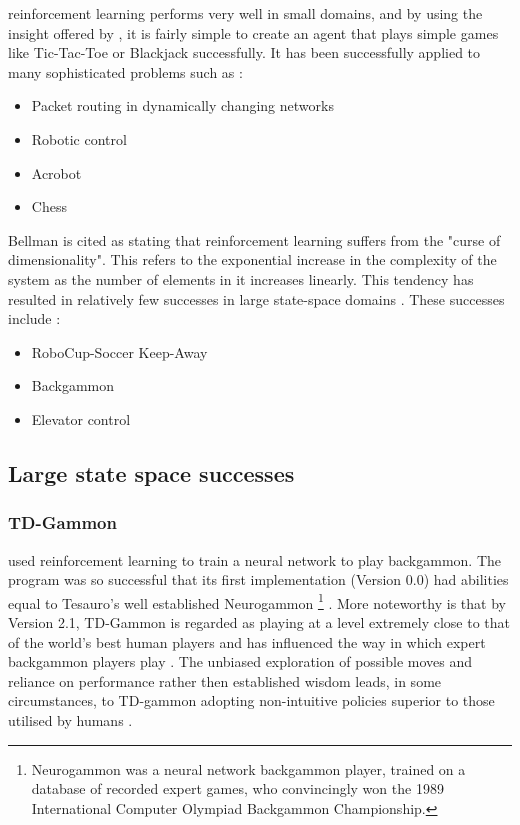 \documentclass{rucsthesis}
\begin{document}
reinforcement learning performs very well in small domains, and by using the insight offered by \cite{suttonbarto}, it is fairly simple to create an agent that plays simple games like Tic-Tac-Toe or Blackjack successfully. It has been successfully applied to many sophisticated problems such as :

\begin{itemize}
\item{Packet routing in dynamically changing networks \citep{boyan94packet}}
\item{Robotic control \citep{rlrobotics}}
\item{Acrobot \citep{suttonbarto} }
\item{Chess \citep{baxter98knightcap}}
\end{itemize}

Bellman is cited \citep{suttonbarto} as stating that reinforcement learning suffers from the "curse of dimensionality".  This refers to the exponential increase in the complexity of the system as the number of elements in it increases linearly. This tendency has resulted in relatively few successes in large state-space domains \citep{keepaway}. These successes include : 

\begin{itemize}
\item{RoboCup-Soccer Keep-Away \citep{keepaway}}
\item{Backgammon \citep{tdgammon}}
\item{Elevator control \citep{elevator}}
\end{itemize}

\subsection{Large state space successes}

\subsubsection{TD-Gammon}

 \cite{tdgammon} used reinforcement learning to train a neural network to play backgammon. The program was so successful that its first implementation (Version 0.0) had abilities equal to Tesauro's well established Neurogammon \footnote{Neurogammon was a neural network backgammon player, trained on a database of recorded expert games, who convincingly won the 1989 International Computer Olympiad Backgammon Championship.} \citep{tdgammon}.  More noteworthy is that by Version 2.1, TD-Gammon is regarded as playing at a level extremely close to that of the world's best human players and has influenced the way in which expert backgammon players play \citep{tdgammon}. The unbiased exploration of possible moves and reliance on performance rather then established wisdom leads, in some circumstances, to TD-gammon adopting non-intuitive policies superior to those utilised by humans \citep{tdgammon}.
\end{document}
